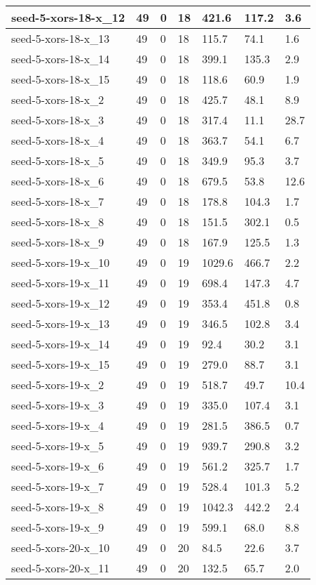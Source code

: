 \begin{scriptsize}
\begin{longtable}{|p{5cm}|l|l|l|l|l|l|}
seed-5-xors-18-x\_12&49&0&18&421.6&117.2&3.6 \\ \hline 
seed-5-xors-18-x\_13&49&0&18&115.7&74.1&1.6 \\ \hline 
seed-5-xors-18-x\_14&49&0&18&399.1&135.3&2.9 \\ \hline 
seed-5-xors-18-x\_15&49&0&18&118.6&60.9&1.9 \\ \hline 
seed-5-xors-18-x\_2&49&0&18&425.7&48.1&8.9 \\ \hline 
seed-5-xors-18-x\_3&49&0&18&317.4&11.1&28.7 \\ \hline 
seed-5-xors-18-x\_4&49&0&18&363.7&54.1&6.7 \\ \hline 
seed-5-xors-18-x\_5&49&0&18&349.9&95.3&3.7 \\ \hline 
seed-5-xors-18-x\_6&49&0&18&679.5&53.8&12.6 \\ \hline 
seed-5-xors-18-x\_7&49&0&18&178.8&104.3&1.7 \\ \hline 
seed-5-xors-18-x\_8&49&0&18&151.5&302.1&0.5 \\ \hline 
seed-5-xors-18-x\_9&49&0&18&167.9&125.5&1.3 \\ \hline 
seed-5-xors-19-x\_10&49&0&19&1029.6&466.7&2.2 \\ \hline 
seed-5-xors-19-x\_11&49&0&19&698.4&147.3&4.7 \\ \hline 
seed-5-xors-19-x\_12&49&0&19&353.4&451.8&0.8 \\ \hline 
seed-5-xors-19-x\_13&49&0&19&346.5&102.8&3.4 \\ \hline 
seed-5-xors-19-x\_14&49&0&19&92.4&30.2&3.1 \\ \hline 
seed-5-xors-19-x\_15&49&0&19&279.0&88.7&3.1 \\ \hline 
seed-5-xors-19-x\_2&49&0&19&518.7&49.7&10.4 \\ \hline 
seed-5-xors-19-x\_3&49&0&19&335.0&107.4&3.1 \\ \hline 
seed-5-xors-19-x\_4&49&0&19&281.5&386.5&0.7 \\ \hline 
seed-5-xors-19-x\_5&49&0&19&939.7&290.8&3.2 \\ \hline 
seed-5-xors-19-x\_6&49&0&19&561.2&325.7&1.7 \\ \hline 
seed-5-xors-19-x\_7&49&0&19&528.4&101.3&5.2 \\ \hline 
seed-5-xors-19-x\_8&49&0&19&1042.3&442.2&2.4 \\ \hline 
seed-5-xors-19-x\_9&49&0&19&599.1&68.0&8.8 \\ \hline 
seed-5-xors-20-x\_10&49&0&20&84.5&22.6&3.7 \\ \hline 
seed-5-xors-20-x\_11&49&0&20&132.5&65.7&2.0 \\ \hline 

\end{longtable}
\end{scriptsize}
